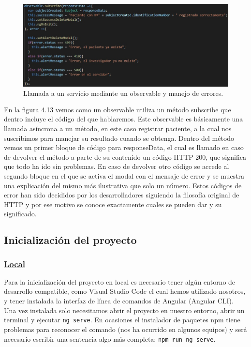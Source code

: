     \begin{figure}[h]
    \centering
    \includegraphics[width=1\textwidth]{images/observableAndErrors.jpg}
    \caption{Llamada a un servicio mediante un observable y manejo de errores.}
    \end{figure}
    \FloatBarrier
    
    En la figura 4.13 vemos como un observable utiliza un método subscribe que dentro incluye el código del que hablaremos. Este observable es básicamente una llamada asíncrona a un método, en este caso registrar paciente, a la cual nos suscribimos para manejar su resultado cuando se obtenga. Dentro del método vemos un primer bloque de código para responseData, el cual es llamado en caso de devolver el método a parte de su contenido un código HTTP 200, que significa que todo ha ido sin problemas. En caso de devolver otro código se accede al segundo bloque en el que se activa el modal con el mensaje de error y se muestra una explicación del mismo más ilustrativa que solo un número. Estos códigos de error han sido decididos por los desarrolladores siguiendo la filosofía original de HTTP y por ese motivo se conoce exactamente cuales se pueden dar y su significado.\newpage
    
    \subsection{Inicialización del proyecto}
    
        \subsubsection{\underline{Local}}
        
        Para la inicialización del proyecto en local es necesario tener algún entorno de desarrollo compatible, como Visual Studio Code el cual hemos utilizado nosotros, y tener instalada la interfaz de línea de comandos de Angular (Angular CLI). Una vez instalada solo necesitamos abrir el proyecto en nuestro entorno, abrir un terminal y ejecutar \texttt{ng serve}. En ocasiones el instalador de paquetes npm tiene problemas para reconocer el comando (nos ha ocurrido en algunos equipos) y será necesario escribir una sentencia algo más completa: \texttt{npm run ng serve}.
